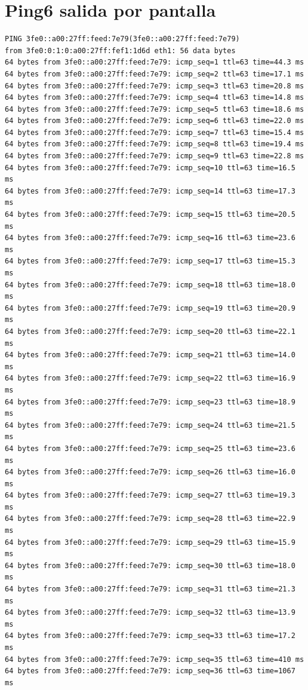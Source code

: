 \documentclass{article}
\begin{document}
\section{Ping6 salida por pantalla}
\begin{Verbatim}
PING 3fe0::a00:27ff:feed:7e79(3fe0::a00:27ff:feed:7e79) 
from 3fe0:0:1:0:a00:27ff:fef1:1d6d eth1: 56 data bytes
64 bytes from 3fe0::a00:27ff:feed:7e79: icmp_seq=1 ttl=63 time=44.3 ms
64 bytes from 3fe0::a00:27ff:feed:7e79: icmp_seq=2 ttl=63 time=17.1 ms
64 bytes from 3fe0::a00:27ff:feed:7e79: icmp_seq=3 ttl=63 time=20.8 ms
64 bytes from 3fe0::a00:27ff:feed:7e79: icmp_seq=4 ttl=63 time=14.8 ms
64 bytes from 3fe0::a00:27ff:feed:7e79: icmp_seq=5 ttl=63 time=18.6 ms
64 bytes from 3fe0::a00:27ff:feed:7e79: icmp_seq=6 ttl=63 time=22.0 ms
64 bytes from 3fe0::a00:27ff:feed:7e79: icmp_seq=7 ttl=63 time=15.4 ms
64 bytes from 3fe0::a00:27ff:feed:7e79: icmp_seq=8 ttl=63 time=19.4 ms
64 bytes from 3fe0::a00:27ff:feed:7e79: icmp_seq=9 ttl=63 time=22.8 ms
64 bytes from 3fe0::a00:27ff:feed:7e79: icmp_seq=10 ttl=63 time=16.5 ms
64 bytes from 3fe0::a00:27ff:feed:7e79: icmp_seq=14 ttl=63 time=17.3 ms
64 bytes from 3fe0::a00:27ff:feed:7e79: icmp_seq=15 ttl=63 time=20.5 ms
64 bytes from 3fe0::a00:27ff:feed:7e79: icmp_seq=16 ttl=63 time=23.6 ms
64 bytes from 3fe0::a00:27ff:feed:7e79: icmp_seq=17 ttl=63 time=15.3 ms
64 bytes from 3fe0::a00:27ff:feed:7e79: icmp_seq=18 ttl=63 time=18.0 ms
64 bytes from 3fe0::a00:27ff:feed:7e79: icmp_seq=19 ttl=63 time=20.9 ms
64 bytes from 3fe0::a00:27ff:feed:7e79: icmp_seq=20 ttl=63 time=22.1 ms
64 bytes from 3fe0::a00:27ff:feed:7e79: icmp_seq=21 ttl=63 time=14.0 ms
64 bytes from 3fe0::a00:27ff:feed:7e79: icmp_seq=22 ttl=63 time=16.9 ms
64 bytes from 3fe0::a00:27ff:feed:7e79: icmp_seq=23 ttl=63 time=18.9 ms
64 bytes from 3fe0::a00:27ff:feed:7e79: icmp_seq=24 ttl=63 time=21.5 ms
64 bytes from 3fe0::a00:27ff:feed:7e79: icmp_seq=25 ttl=63 time=23.6 ms
64 bytes from 3fe0::a00:27ff:feed:7e79: icmp_seq=26 ttl=63 time=16.0 ms
64 bytes from 3fe0::a00:27ff:feed:7e79: icmp_seq=27 ttl=63 time=19.3 ms
64 bytes from 3fe0::a00:27ff:feed:7e79: icmp_seq=28 ttl=63 time=22.9 ms
64 bytes from 3fe0::a00:27ff:feed:7e79: icmp_seq=29 ttl=63 time=15.9 ms
64 bytes from 3fe0::a00:27ff:feed:7e79: icmp_seq=30 ttl=63 time=18.0 ms
64 bytes from 3fe0::a00:27ff:feed:7e79: icmp_seq=31 ttl=63 time=21.3 ms
64 bytes from 3fe0::a00:27ff:feed:7e79: icmp_seq=32 ttl=63 time=13.9 ms
64 bytes from 3fe0::a00:27ff:feed:7e79: icmp_seq=33 ttl=63 time=17.2 ms
64 bytes from 3fe0::a00:27ff:feed:7e79: icmp_seq=35 ttl=63 time=410 ms
64 bytes from 3fe0::a00:27ff:feed:7e79: icmp_seq=36 ttl=63 time=1067 ms

\end{Verbatim}
\end{document}

